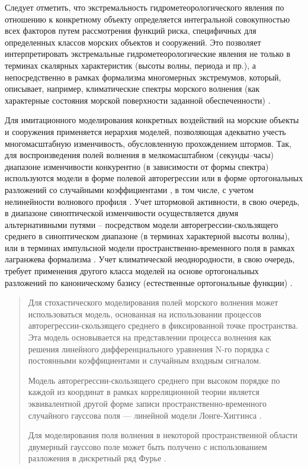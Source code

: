 Следует отметить, что экстремальность гидрометеорологического явления по отношению к конкретному объекту определяется интегральной совокупностью всех факторов путем рассмотрения функций риска, специфичных для определенных классов морских объектов и сооружений. Это позволяет интерпретировать экстремальные гидрометеорологические явления не только в терминах скалярных характеристик (высоты волны, периода и пр.), а непосредственно в рамках формализма многомерных экстремумов, который, описывает, например, климатические спектры морского волнения (как характерные состояния морской поверхности заданной обеспеченности) \citep{dk4}\citep{dk5}.

Для имитационного моделирования конкретных воздействий на морские объекты и сооружения применяется иерархия моделей, позволяющая адекватно учесть многомасштабную изменчивость, обусловленную прохождением штормов. Так, для воспроизведения полей волнения в мелкомасштабном (секунды--часы) диапазоне изменчивости конкурентно (в зависимости от формы спектра) используются модели в форме полевой авторегрессии \citep{dk6} или в форме ортогональных разложений со случайными коэффициентами \citep{dk7}, в том числе, с учетом нелинейности волнового профиля \citep{dk8}. Учет штормовой активности, в свою очередь, в диапазоне синоптической изменчивости осуществляется двумя альтернативными путями – посредством модели авторегрессии-скользящего среднего \citep{dk9} в синоптическом диапазоне (в терминах характерной высоты волны), или в терминах импульсной модели пространственно-временного поля в рамках лагранжева формализма \citep{dk10}. Учет климатической неоднородности, в свою очередь, требует применения другого класса моделей на основе ортогональных разложений по каноническому базису (естественные ортогональные функции) \citep{dk11}.

\begin{quote}
Для стохастического моделирования полей морского волнения может использоваться модель, основанная на использовании процессов авторегрессии-скользящего среднего \citep{p295I_31} в фиксированной точке пространства. Эта модель основывается на представлении процесса волнения как решения линейного дифференциального уравнения N-го порядка с постоянными коэффициентами и случайным входным сигналом.

Модель авторегрессии-скользящего среднего при высоком порядке по каждой из координат в рамках корреляционной теории является эквивалентной другой форме записи пространственно-временного случайного гауссова поля --- линейной модели Лонге-Хиггинса \citep{p295I_45}.

Для моделирования поля волнения в некоторой пространственной области двумерный гауссово поле может быть получено с использованием разложения в дискретный ряд Фурье \citep{krogstad89}.
\end{quote}

